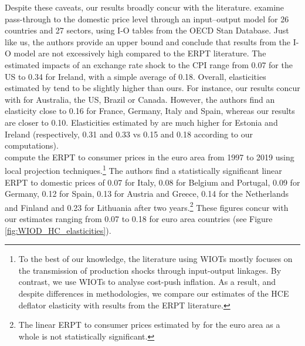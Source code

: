 \documentclass[11pt,a4paper]{paper} %
\begin{document}
Despite these caveats, our results broadly concur with the literature.
\cite{Aydogus2018} examine pass-through to the domestic price level through an input–output model for 26 countries and 27 sectors, using I-O tables from the OECD Stan Database. 
Just like us, the authors provide an upper bound and conclude that results from the I-O model are not excessively high compared to the ERPT literature.
The estimated impacts of an exchange rate shock to the CPI range from 0.07 for the US to 0.34 for Ireland, with a simple average of 0.18.
Overall, elasticities estimated by \cite{Aydogus2018} tend to be slightly higher than ours. 
For instance, our results concur with \cite{Aydogus2018} for Australia, the US, Brazil or Canada. 
However, the authors find an elasticity close to 0.16 for France, Germany, Italy and Spain, whereas our results are closer to 0.10.
Elasticities estimated by \cite{Aydogus2018} are much higher for Estonia and Ireland (respectively, 0.31 and 0.33 vs 0.15 and 0.18 according to our computations).\\  
\cite{Colavecchio2020} compute the ERPT to consumer prices in the euro area from 1997 to 2019 using local projection techniques.\footnote{To the best of our knowledge, the literature using WIOTs mostly focuses on the transmission of production shocks through input-output linkages. By contrast, we use WIOTs to analyse cost-push inflation. As a result, and despite differences in methodologies, we compare our estimates of the HCE deflator elasticity with results from the ERPT literature.} 
The authors find a statistically significant linear ERPT to domestic prices of 0.07 for Italy, 0.08 for Belgium and Portugal, 0.09 for Germany, 0.12 for Spain, 0.13 for Austria and Greece, 0.14 for the Netherlands and Finland and 0.23 for Lithuania after two years.\footnote{The linear ERPT to consumer prices estimated by \cite{Colavecchio2020} for the euro area as a whole is not statistically significant.}
These figures concur with our estimates ranging from 0.07 to 0.18 for euro area countries (see Figure \ref{fig:WIOD_HC_elasticities}). 

\end{document}
